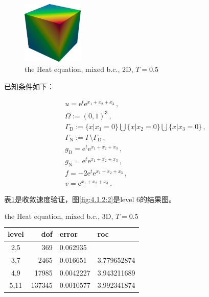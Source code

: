 \begin{figure}[!htbp]
  \centering
  \includegraphics[height=3cm]{fig/4/fig:1.1.1:2.png}
  \caption{the Heat equation, mixed b.c., 2D, $T=0.5$}
  \label{fig:4.1.2:1}
\end{figure}


已知条件如下：

\begin{subequations}	   
  \begin{align*}	      
   &u=\mathrm e^t\mathrm e^{x_1+x_2+x_3}\,,\\
   &\Omega:=(0,1)^3\,,\\
   &\Gamma_{\mathrm D}:=\{x|x_1=0\}\bigcup\{x|x_2=0\}\bigcup\{x|x_3=0\}\,,\\
   &\Gamma_{\mathrm N}:=\Gamma\setminus\Gamma_{\mathrm D}\,, \\
   &g_{\mathrm D}=\mathrm e^t\mathrm e^{x_1+x_2+x_3}\,,\\
   &g_{\mathrm N}=\mathrm e^t\mathrm e^{x_1+x_2+x_3}\,,\\
   &f=-2\mathrm e^t\mathrm e^{x_1+x_2+x_3}\,,\\
    &v=\mathrm e^{x_1+x_2+x_3}\,.
  \end{align*}
\end{subequations}	   

表\ref{tab:4.1.2:2}是收敛速度验证，图\ref{fig:4.1.2:2}是level 6的结果图。

\begin{table}[!htbp]\label{tab:4.1.2:2}
  \centering
  \begin{tabular}{c|r|l|l}
    level   &       dof  &          error    &       roc \\
    \hline
    2,5     &    369     &       0.062935 &\\
    \hline
    3,7     &    2465    &       0.016651  &      3.779652874 \\
    \hline
    4,9     &    17985   &       0.0042227  &     3.943211689 \\
    \hline
    5,11    &    137345  &       0.0010577   &    3.992341874
  \end{tabular}
  \caption{the Heat equation, mixed b.c., 3D, $T=0.5$}
\end{table}


